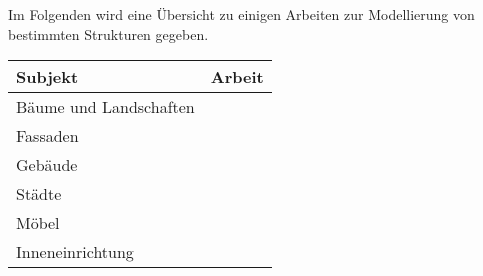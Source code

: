 Im Folgenden wird eine Übersicht zu einigen Arbeiten zur Modellierung von bestimmten Strukturen gegeben.
\begin{center}
    \begin{tabular}{ll}
        Subjekt & Arbeit\\
        \hline
        Bäume und Landschaften & ~\cite{deussen_2010} \\
        Fassaden & ~\cite{alhalawani_2013} \\
        Gebäude & ~\cite{mueller_2006} \\
        Städte & ~\cite{parish_2001} \\
        Möbel & ~\cite{merrell_2011} \\
        Inneneinrichtung & ~\cite{zhang_2019} \\
    \end{tabular}
\end{center}

